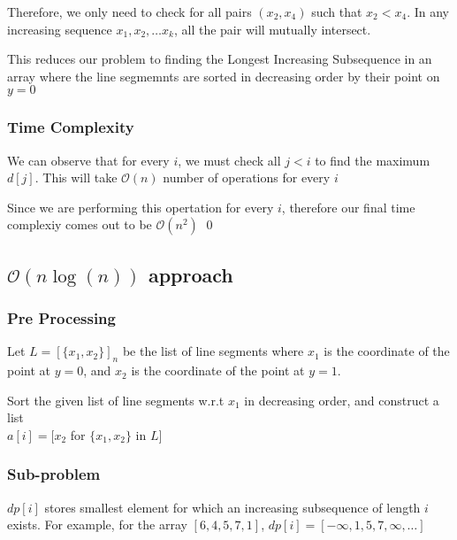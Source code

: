 \documentclass[12pt]{article}
\begin{document}
Therefore, we only need to check for all pairs $(x_2, x_4)$ such that $x_2 < x_4$. In any increasing sequence $x_1, x_2, \dots x_k$, all the pair will mutually intersect.

This reduces our problem to finding the Longest Increasing Subsequence in an array where the line segmemnts are sorted in decreasing order by their point on $y = 0$


\subsubsection{Time Complexity}

We can observe that for every $i$, we must check all $j < i$ to find the maximum $d[j]$. This will take $\mathcal{O}(n)$ number of operations for every $i$

Since we are performing this opertation for every $i$, therefore our final time complexiy comes out to be $\mathcal{O}(n^2)$
\qed












\pagebreak

\subsection{\texorpdfstring{$\mathcal{O}(n\log(n))$}{Lg} approach}

\subsubsection{Pre Processing}

Let $L = [\{x_1, x_2\}]_n$ be the list of line segments where $x_1$ is the coordinate of the point at $y = 0$, and $x_2$ is the coordinate of the point at $y = 1$.

Sort the given list of line segments w.r.t $x_1$ in decreasing order, and construct a list \\ $a[i] = [x_2$ for $\{x_1, x_2\}$ in $L]$


\subsubsection{Sub-problem}

$dp[i]$ stores smallest element for which an increasing subsequence of length $i$ exists. For example, for the array ${[6, 4, 5, 7, 1]}$,
$dp[i] = [-\infty, 1, 5, 7, \infty, \dots]$
\end{document}
